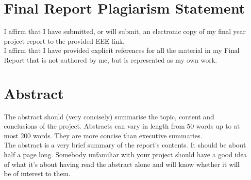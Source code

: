 \section*{Final Report Plagiarism Statement}
I affirm that I have submitted, or will submit, an electronic copy of 
my final year project report to the provided EEE link.\\ \newline \noindent I affirm 
that I have provided explicit references for all the material in my Final Report that 
is not authored by me, but is represented as my own work.

\newpage


\section*{Abstract}
The abstract should (very concisely) summarise the
topic, content and conclusions of the project.
Abstracts can vary in length from 50 words up to at
most 200 words. They are more concise than
executive summaries. \\ \newline \noindent The abstract is a very brief summary of
the report's contents. It should be about half a
page long. Somebody unfamiliar with your
project should have a good idea of what it's
about having read the abstract alone and will
know whether it will be of interest to them.
